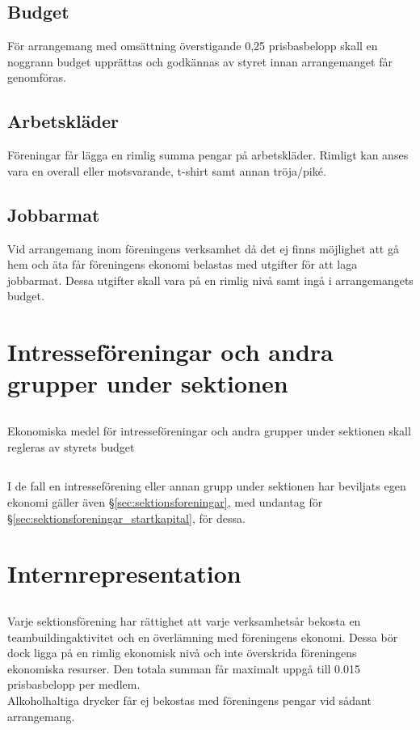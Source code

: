 \documentclass[a4paper, 10pt]{article}
\begin{document}
\subsection{Budget}
För arrangemang med omsättning överstigande 0,25 prisbasbelopp skall en noggrann budget upprättas och godkännas av styret innan arrangemanget får genomföras.
\subsection{Arbetskläder}
Föreningar får lägga en rimlig summa pengar på arbetskläder. Rimligt kan anses vara en overall eller motsvarande, t-shirt samt annan tröja/piké.
\subsection{Jobbarmat}
Vid arrangemang inom föreningens verksamhet då det ej finns möjlighet att gå hem och äta får föreningens ekonomi belastas med utgifter för att laga jobbarmat. Dessa utgifter skall vara på en rimlig nivå samt ingå i arrangemangets budget.

\section{Intresseföreningar och andra grupper under sektionen}
\subsection{}
Ekonomiska medel för intresseföreningar och andra grupper under sektionen skall regleras av styrets budget
\subsection{}
I de fall en intresseförening eller annan grupp under sektionen har beviljats egen ekonomi gäller även §\ref{sec:sektionsforeningar}, med undantag för §\ref{sec:sektionsforeningar_startkapital}, för dessa.

\section{Internrepresentation}
\subsection{}
\label{sec:internreps}
Varje sektionsförening har rättighet att varje verksamhetsår bekosta en teambuildingaktivitet och en överlämning med föreningens ekonomi. Dessa bör dock ligga på en rimlig ekonomisk nivå och inte överskrida föreningens ekonomiska resurser. Den totala summan får maximalt uppgå till 0.015 prisbasbelopp per medlem.\\
Alkoholhaltiga drycker får ej bekostas med föreningens pengar vid sådant arrangemang.
\end{document}
